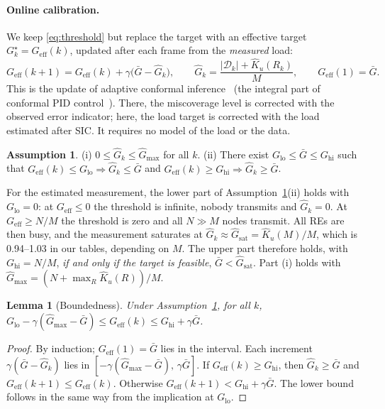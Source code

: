 \documentclass[10pt]{article}
\newtheorem{lemma}{Lemma}
\theoremstyle{remark}
\theoremstyle{definition}
\newtheorem{assumption}{Assumption}
\newcommand{\Gb}{\bar G}
\newcommand{\Ge}{G_{\mathrm{eff}}}
\newcommand{\Gm}{\hat G}
\newcommand{\Kh}{\hat K_u}
\newcommand{\Dset}{\mathcal D}
\begin{document}
\paragraph{Online calibration.} We keep \eqref{eq:threshold} but replace the target with an
effective target $G_k^\star=\Ge(k)$, updated after each frame from the \emph{measured} load:
\begin{equation}
  \label{eq:calib}
  \Ge(k+1) = \Ge(k) + \gamma\big(\Gb - \Gm_k\big),
  \qquad
  \Gm_k = \frac{|\Dset_k| + \Kh(R_k)}{M},
  \qquad \Ge(1)=\Gb .
\end{equation}
This is the update of adaptive conformal inference~\cite{gibbs2021aci} (the integral
part of conformal PID control~\cite{angelopoulos2023pid}). There, the
miscoverage level is corrected with the observed error indicator; here, the load target is
corrected with the load estimated after SIC. It requires no model of the load or the data.

\begin{assumption}
  \label{ass}
  (i) $0\le\Gm_k\le\Gm_{\max}$ for all $k$.
  (ii) There exist $G_{\mathrm{lo}}\le\Gb\le G_{\mathrm{hi}}$ such that
  $\Ge(k)\le G_{\mathrm{lo}} \Rightarrow \Gm_k\le\Gb$ and
  $\Ge(k)\ge G_{\mathrm{hi}} \Rightarrow \Gm_k\ge\Gb$.
\end{assumption}
For the estimated measurement, the lower part of Assumption~\ref{ass}(ii) holds with
$G_{\mathrm{lo}}=0$: at $\Ge\le0$ the threshold is infinite, nobody transmits and $\Gm_k=0$.
At $\Ge\ge N/M$ the threshold is zero and all $N\gg M$ nodes transmit. All REs are then busy,
and the measurement saturates at $\Gm_k\approx\Gm_{\mathrm{sat}}=\Kh(M)/M$, which is
0.94--1.03 in our tables, depending on $M$. The upper part therefore holds, with $G_{\mathrm{hi}}=N/M$,
\emph{if and only if the target is feasible}, $\Gb<\Gm_{\mathrm{sat}}$. Part (i) holds with
$\Gm_{\max}=(N+\max_R\Kh(R))/M$.

\begin{lemma}[Boundedness]
  \label{lem:bounded}
  Under Assumption~\ref{ass}, for all $k$,
  $G_{\mathrm{lo}}-\gamma(\Gm_{\max}-\Gb)\le\Ge(k)\le G_{\mathrm{hi}}+\gamma\Gb$.
\end{lemma}
\begin{proof}
  By induction; $\Ge(1)=\Gb$ lies in the interval. Each increment
  $\gamma(\Gb-\Gm_k)$ lies in $[-\gamma(\Gm_{\max}-\Gb),\,\gamma\Gb]$. If
  $\Ge(k)\ge G_{\mathrm{hi}}$, then $\Gm_k\ge\Gb$ and $\Ge(k+1)\le\Ge(k)$. Otherwise
  $\Ge(k+1)<G_{\mathrm{hi}}+\gamma\Gb$. The lower bound follows in the same way from the
  implication at $G_{\mathrm{lo}}$.
\end{proof}
\end{document}
